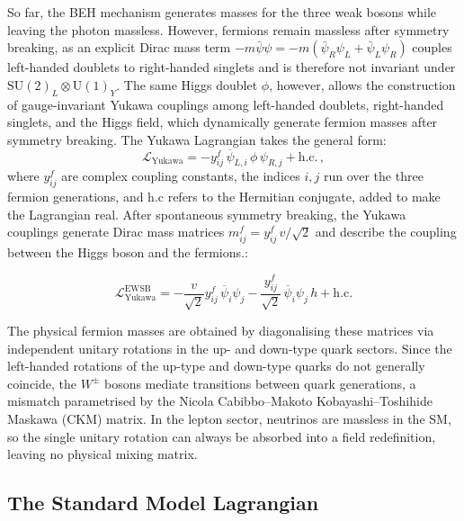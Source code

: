 \vspace{0.5 cm}

So far, the BEH mechanism generates masses for the three weak bosons while leaving the photon massless. However, fermions remain massless after symmetry breaking, as an explicit Dirac mass term $-m\bar{\psi}\psi = -m\left(\bar{\psi}_R\psi_L + \bar{\psi}_L\psi_R\right)$ couples left-handed doublets to right-handed singlets and is therefore not invariant under $\mathrm{SU}(2)_L \otimes \mathrm{U}(1)_Y$. The same Higgs doublet $\phi$, however, allows the construction of gauge-invariant Yukawa couplings among left-handed doublets, right-handed singlets, and the Higgs field, which dynamically generate fermion masses after symmetry breaking. The Yukawa Lagrangian takes the general form:
\begin{equation}
    \mathcal{L}_{\mathrm{Yukawa}} = - y^f_{ij}\, \overline{\psi}_{L,i}\, \phi\, \psi_{R,j} + \mathrm{h.c.} \, ,
\end{equation}
where $y^f_{ij}$ are complex coupling constants, the indices $i,j$ run over the three fermion generations, and h.c refers to the Hermitian conjugate, added to make the Lagrangian real. After spontaneous symmetry breaking, the Yukawa couplings generate Dirac mass matrices $m^f_{ij} = y^f_{ij}\, v/\sqrt{2}$ and describe the coupling between the Higgs boson and the fermions.:

\begin{equation}
    \mathcal{L}_{\mathrm{Yukawa}}^\mathrm{EWSB}=  -\frac{v}{\sqrt{2}} y^f_{ij}\,\overline{\psi}_i \psi_j - \frac{y^f_{ij}}{\sqrt{2}}\, \overline{\psi}_i \psi_j\, h + \mathrm{h.c.}
\end{equation}

The physical fermion masses are obtained by diagonalising these matrices via independent unitary rotations in the up- and down-type quark sectors. Since the left-handed rotations of the up-type and down-type quarks do not generally coincide, the $W^\pm$ bosons mediate transitions between quark generations, a mismatch parametrised by the Nicola Cabibbo--Makoto Kobayashi--Toshihide Maskawa (CKM) matrix. In the lepton sector, neutrinos are massless in the SM, so the single unitary rotation can always be absorbed into a field redefinition, leaving no physical mixing matrix.


\subsection{The Standard Model Lagrangian}


